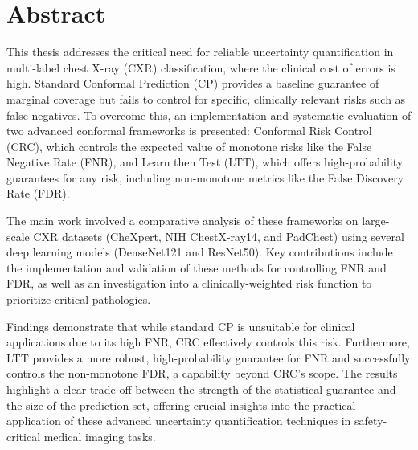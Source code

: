 \chapter*{Abstract}

This thesis addresses the critical need for reliable uncertainty quantification
in multi-label chest X-ray (CXR) classification,
where the clinical cost of errors is high.
Standard Conformal Prediction (CP) provides a baseline guarantee of marginal coverage
but fails to control for specific, clinically relevant risks such as false negatives.
To overcome this, an implementation and systematic evaluation
of two advanced conformal frameworks is presented:
Conformal Risk Control (CRC),
which controls the expected value of monotone risks like the False Negative Rate (FNR),
and Learn then Test (LTT), which offers high-probability guarantees for any risk,
including non-monotone metrics like the False Discovery Rate (FDR).

The main work involved a comparative analysis of these frameworks on large-scale CXR datasets
(CheXpert, NIH ChestX-ray14, and PadChest)
using several deep learning models (DenseNet121 and ResNet50).
Key contributions include the implementation and validation of these methods
for controlling FNR and FDR,
as well as an investigation into a clinically-weighted risk function
to prioritize critical pathologies.

Findings demonstrate that while standard CP is unsuitable
for clinical applications due to its high FNR, CRC effectively controls this risk.
Furthermore, LTT provides a more robust, high-probability guarantee for FNR
and successfully controls the non-monotone FDR, a capability beyond CRC's scope.
The results highlight a clear trade-off between the strength of the statistical guarantee
and the size of the prediction set,
offering crucial insights into the practical application of these advanced
uncertainty quantification techniques in safety-critical medical imaging tasks.
